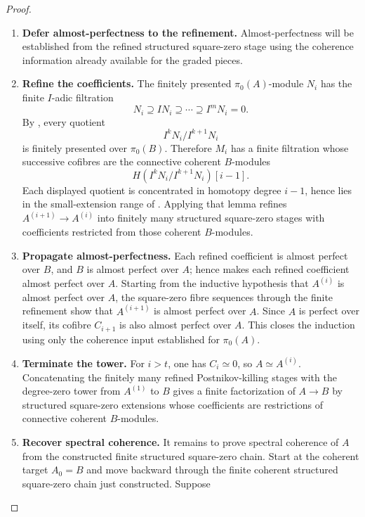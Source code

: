 \begin{proof}
\begin{enumerate}[label=\textup{(\arabic*)}]
    \item \textbf{Defer almost-perfectness to the refinement.}
    Almost-perfectness will be established from the refined structured square-zero stage
    using the coherence information already available for the graded pieces.
    \item \textbf{Refine the coefficients.}
    The finitely presented \(\pi_0(A)\)-module \(N_i\) has the finite
    \(I\)-adic filtration
    \[
        N_i\supseteq IN_i\supseteq\cdots\supseteq I^mN_i=0.
    \]
    By , every quotient
    \[
        I^kN_i/I^{k+1}N_i
    \]
    is finitely presented over \(\pi_0(B)\). Therefore \(M_i\) has a finite
    filtration whose successive cofibres are the connective coherent \(B\)-modules
    \[
        H(I^kN_i/I^{k+1}N_i)[i-1].
    \]
    Each displayed quotient is concentrated in homotopy degree \(i-1\), hence
    lies in the small-extension range of
    . Applying that lemma
    refines \(A^{(i+1)}\to A^{(i)}\) into finitely many structured square-zero
    stages with coefficients restricted from those coherent \(B\)-modules.
    \item \textbf{Propagate almost-perfectness.}
    Each refined coefficient is almost perfect over \(B\), and \(B\) is almost
    perfect over \(A\); hence 
    makes each refined coefficient almost perfect over \(A\).
    Starting from the inductive hypothesis that \(A^{(i)}\) is almost perfect over
    \(A\), the square-zero fibre sequences through the finite refinement show that
    \(A^{(i+1)}\) is almost perfect over \(A\). Since \(A\) is perfect over
    itself, its cofibre \(C_{i+1}\) is also almost perfect over \(A\). This closes the induction using only the coherence input established for
    \(\pi_0(A)\).
    \item \textbf{Terminate the tower.}
    For \(i>t\), one has \(C_i\simeq0\), so \(A\simeq A^{(i)}\). Concatenating
    the finitely many refined Postnikov-killing stages with the degree-zero tower
    from \(A^{(1)}\) to \(B\) gives a finite factorization of \(A\to B\) by
    structured square-zero extensions whose coefficients are restrictions of
    connective coherent \(B\)-modules.
    \item \textbf{Recover spectral coherence.}
    It remains to prove spectral coherence of \(A\) from the constructed finite
    structured square-zero chain. Start at the coherent target \(A_0=B\) and move backward through
    the finite coherent structured square-zero chain just constructed. Suppose

\end{enumerate}
\end{proof}

